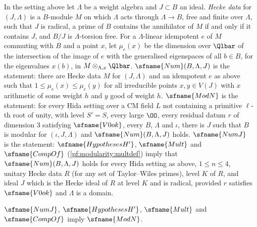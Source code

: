 \begin{definition}[Multiplicities]\label{pf:modularity:modNdef}
In the setting above let $\Lambda$ be a weight algebra and $J\subset B$ an ideal. \emph{Hecke data} for $(J,\Lambda)$ is
a $B$-module $M$ on which $\Lambda$ acts through $\Lambda\to B$, free and finite over $\Lambda$, such that $J$ is radical,
a prime of $B$ contains the annihilator of $M$ if and only if it contains $J$, and $B/J$ is $\Lambda$-torsion free. For a
$\Lambda$-linear idempotent $e$ of $M$ commuting with $B$ and a point $x$, let $\mu_e(x)$ be the dimension over $\Qlbar$ of
the intersection of the image of $e$ with the generalised eigenspaces of all $b\in B$, for the eigenvalues $x(b)$, in
$M\otimes_{\Lambda,x}\Qlbar$. $\sfname{Num}(B,\Lambda,J)$ is the statement: there are Hecke data $M$ for $(J,\Lambda)$ and
an idempotent $e$ as above such that $1\le\mu_e(x)\le\mu_e(y)$ for all irreducible points $x,y\in V(J)$ with $x$
arithmetic of some weight $h$ and $y$ good of weight $h$. $\sfname{ModN}$ is the statement: for every Hida setting over a
CM field $L$ not containing a primitive $\ell$-th root of unity, with level $S'=S$, every large $\OO$, every residual datum
$r$ of dimension $3$ satisfying $\sfname{V0ok}$, every $B$, $\Lambda$ and $\iota$, there is $J$ such that $B$ is modular
for $(\iota,J,\Lambda)$ and $\sfname{Num}(B,\Lambda,J)$ holds. $\sfname{NumJ}$ is the statement: $\sfname{HypothesesH'}$,
$\sfname{Mult}$ and $\sfname{CompOf}$ (\cref{pf:modularity:multdef}) imply that $\sfname{Num}(B,\Lambda,J)$ holds for every
Hida setting as above, $1\le n\le4$, unitary Hecke data $R$ (for any set of Taylor--Wiles primes), level $K$ of $R$, and
ideal $J$ which is the Hecke ideal of $R$ at level $K$ and is radical, provided $r$ satisfies $\sfname{V0ok}$ and $\Lambda$
is a domain.
\end{definition}

\begin{theorem}\label{pf:modularity:modNnum}
$\sfname{NumJ}$, $\sfname{HypothesesH'}$, $\sfname{Mult}$ and $\sfname{CompOf}$ imply $\sfname{ModN}$.
\end{theorem}

